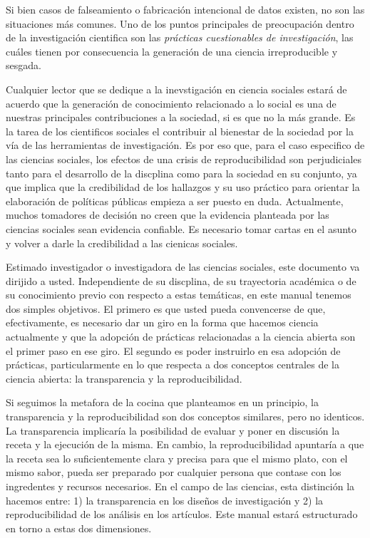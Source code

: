 \documentclass[
]{book}
\begin{document}
Si bien casos de falseamiento o fabricación intencional de datos existen, no son las situaciones más comunes. Uno de los puntos principales de preocupación dentro de la investigación cientifica son las \emph{prácticas cuestionables de investigación}, las cuáles tienen por consecuencia la generación de una ciencia irreproducible y sesgada.

Cualquier lector que se dedique a la inevstigación en ciencia sociales estará de acuerdo que la generación de conocimiento relacionado a lo social es una de nuestras principales contribuciones a la sociedad, si es que no la más grande. Es la tarea de los cientificos sociales el contribuir al bienestar de la sociedad por la vía de las herramientas de investigación. Es por eso que, para el caso especifico de las ciencias sociales, los efectos de una crisis de reproducibilidad son perjudiciales tanto para el desarrollo de la discplina como para la sociedad en su conjunto, ya que implica que la credibilidad de los hallazgos y su uso práctico para orientar la elaboración de políticas públicas empieza a ser puesto en duda. Actualmente, muchos tomadores de decisión no creen que la evidencia planteada por las ciencias sociales sean evidencia confiable. Es necesario tomar cartas en el asunto y volver a darle la credibilidad a las cienicas sociales.

Estimado investigador o investigadora de las ciencias sociales, este documento va dirijido a usted. Independiente de su discplina, de su trayectoria académica o de su conocimiento previo con respecto a estas temáticas, en este manual tenemos dos simples objetivos. El primero es que usted pueda convencerse de que, efectivamente, es necesario dar un giro en la forma que hacemos ciencia actualmente y que la adopción de prácticas relacionadas a la ciencia abierta son el primer paso en ese giro. El segundo es poder instruirlo en esa adopción de prácticas, particularmente en lo que respecta a dos conceptos centrales de la ciencia abierta: la transparencia y la reproducibilidad.

Si seguimos la metafora de la cocina que planteamos en un principio, la transparencia y la reproducibilidad son dos conceptos similares, pero no identicos. La transparencia implicaría la posibilidad de evaluar y poner en discusión la receta y la ejecución de la misma. En cambio, la reproducibilidad apuntaría a que la receta sea lo suficientemente clara y precisa para que el mismo plato, con el mismo sabor, pueda ser preparado por cualquier persona que contase con los ingredentes y recursos necesarios. En el campo de las ciencias, esta distinción la hacemos entre: 1) la transparencia en los diseños de investigación y 2) la reproducibilidad de los análisis en los artículos. Este manual estará estructurado en torno a estas dos dimensiones.
\end{document}
